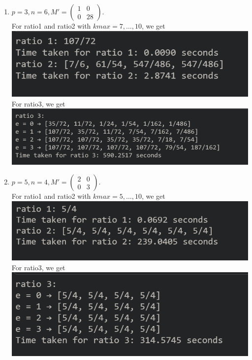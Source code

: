 \documentclass[letterpaper,12pt]{article}
\begin{document}
\begin{enumerate}
\item $p=3, n=6, M' = \begin{pmatrix}
1 & 0 \\ 0 & 28
\end{pmatrix}.$ \\
For ratio1 and ratio2 with $kmax = 7, \dots, 10$, we get \\
\includegraphics[scale=0.5]{ex6_1.png} \\
For ratio3, we get \\
\includegraphics[scale=0.5]{ex6_2.png}

\item $p=5, n=4, M' = \begin{pmatrix}
2 & 0 \\ 0 & 3
\end{pmatrix}.$ \\
For ratio1 and ratio2 with $kmax = 5, \dots, 10$, we get \\
\includegraphics[scale=0.5]{ex7_1.png} \\
For ratio3, we get \\
\includegraphics[scale=0.5]{ex7_2.png}


\end{enumerate}
\end{document}
